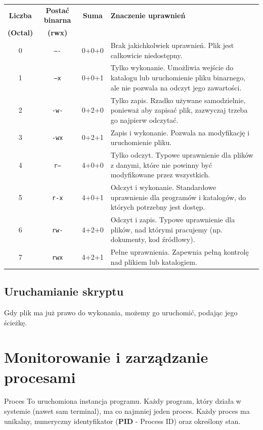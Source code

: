 \begin{tcolorbox}[colback=black!5, colframe=titlebg, title=Pełna tabela systemu ósemkowego uprawnień (0-7), halign=center]
\centering
\begin{tabularx}{\linewidth}{|c|c|c|X|}
\hline
\textbf{Liczba} & \textbf{Postać binarna} & \textbf{Suma} & \textbf{Znaczenie uprawnień} \\
\textbf{(Octal)} & \textbf{(rwx)} & & \\
\hline
\hline
0 & \texttt{----} & 0+0+0 & Brak jakichkolwiek uprawnień. Plik jest całkowicie niedostępny. \\
\hline
1 & \texttt{---x} & 0+0+1 & Tylko wykonanie. Umożliwia wejście do katalogu lub uruchomienie pliku binarnego, ale nie pozwala na odczyt jego zawartości. \\
\hline
2 & \texttt{-w-} & 0+2+0 & Tylko zapis. Rzadko używane samodzielnie, ponieważ aby zapisać plik, zazwyczaj trzeba go najpierw odczytać. \\
\hline
3 & \texttt{-wx} & 0+2+1 & Zapis i wykonanie. Pozwala na modyfikację i uruchomienie pliku. \\
\hline
4 & \texttt{r---} & 4+0+0 & Tylko odczyt. Typowe uprawnienie dla plików z danymi, które nie powinny być modyfikowane przez wszystkich. \\
\hline
5 & \texttt{r-x} & 4+0+1 & Odczyt i wykonanie. Standardowe uprawnienie dla programów i katalogów, do których potrzebny jest dostęp. \\
\hline
6 & \texttt{rw-} & 4+2+0 & Odczyt i zapis. Typowe uprawnienie dla plików, nad którymi pracujemy (np. dokumenty, kod źródłowy). \\
\hline
7 & \texttt{rwx} & 4+2+1 & Pełne uprawnienia. Zapewnia pełną kontrolę nad plikiem lub katalogiem. \\
\hline
\end{tabularx}
\end{tcolorbox}

\subsection{Uruchamianie skryptu}
Gdy plik ma już prawo do wykonania, możemy go uruchomić, podając jego ścieżkę.

\section{Monitorowanie i zarządzanie procesami}
\begin{definitionbox}{Proces}
To uruchomiona instancja programu. Każdy program, który działa w systemie (nawet sam terminal), ma co najmniej jeden proces. Każdy proces ma unikalny, numeryczny identyfikator (\textbf{PID} - Process ID) oraz określony stan.
\end{definitionbox}

